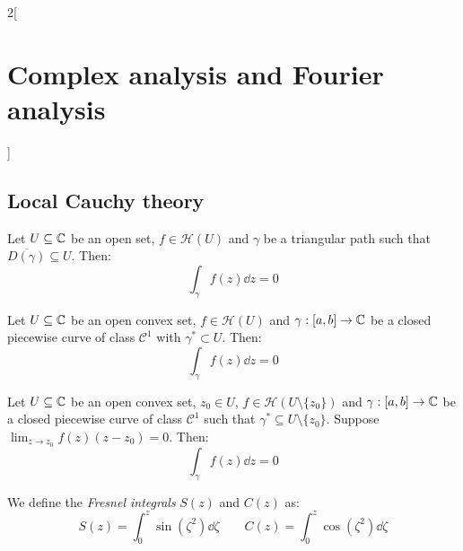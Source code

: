 \documentclass[../../../main.tex]{subfiles}
\begin{document}
\begin{multicols}{2}[\section{Complex analysis and Fourier analysis}]
  \subsection{Local Cauchy theory}
  \begin{theorem}
    Let $U\subseteq \mathbb{C}$ be an open set, $f\in\mathcal{H}(U)$ and $\gamma$ be a triangular path such that $\overline{D(\gamma)}\subseteq U$. Then: $$\int_\gamma f(z)\dd{z}=0$$
  \end{theorem}
  \begin{theorem}
    Let $U\subseteq \mathbb{C}$ be an open convex set, $f\in\mathcal{H}(U)$ and $\gamma:[a,b]\rightarrow\mathbb{C}$ be a closed piecewise curve of class $\mathcal{C}^1$ with $\gamma^*\subset U$. Then: $$\int_\gamma f(z)\dd{z}=0$$
  \end{theorem}
  \begin{lemma}
    Let $U\subseteq \mathbb{C}$ be an open convex set, $z_0\in U$, $f\in\mathcal{H}(U\setminus\{z_0\})$ and $\gamma:[a,b]\rightarrow\mathbb{C}$ be a closed piecewise curve of class $\mathcal{C}^1$ such that $\gamma^*\subseteq U\setminus\{z_0\}$. Suppose $\displaystyle\lim_{z\to z_0}f(z)(z-z_0)=0$. Then: $$\int_\gamma f(z)\dd{z}=0$$
  \end{lemma}
  \begin{definition}
    We define the \emph{Fresnel integrals} $S(z)$ and $C(z)$ as:
    $$S(z)=\int_0^z\sin(\zeta^2)\dd{\zeta}\qquad C(z)=\int_0^z\cos(\zeta^2)\dd{\zeta}$$
  \end{definition}

\end{multicols}
\end{document}
